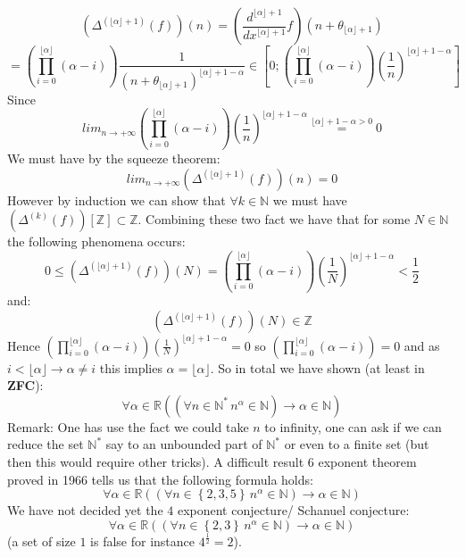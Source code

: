 \begin{solution}
    \[
        \left(\Delta^{\left(\lfloor\alpha\rfloor+1\right)}\left(f\right)\right)\left(n\right)=\left(\frac{d^{\lfloor\alpha\rfloor+1}}{dx^{\lfloor\alpha\rfloor+1}}f\right)\left(n+\theta_{\lfloor\alpha\rfloor+1}\right)
    \]
    \[
        =\left(\prod_{i=0}^{\lfloor\alpha\rfloor}\left(\alpha-i\right)\right)\frac{1}{\left(n+\theta_{\lfloor\alpha\rfloor+1}\right)^{\lfloor\alpha\rfloor+1-\alpha}}\in\left[0;\left(\prod_{i=0}^{\lfloor\alpha\rfloor}\left(\alpha-i\right)\right)\left(\frac{1}{n}\right)^{\lfloor\alpha\rfloor+1-\alpha}\right]
    \]
    Since
    \[
        lim_{n\rightarrow+\infty}\left(\prod_{i=0}^{\lfloor\alpha\rfloor}\left(\alpha-i\right)\right)\left(\frac{1}{n}\right)^{\lfloor\alpha\rfloor+1-\alpha}\overset{\lfloor\alpha\rfloor+1-\alpha>0}{=}0
    \]
    We must have by the squeeze theorem:
    \[
        lim_{n\rightarrow+\infty}\left(\Delta^{\left(\lfloor\alpha\rfloor+1\right)}\left(f\right)\right)\left(n\right)=0
    \]
    However by induction we can show that \( \forall k\in\mathbb{N} \) we must have \( \left(\Delta^{\left(k\right)}\left(f\right)\right)\left[\mathbb{Z}\right]\subset\mathbb{Z} \). Combining these two fact we have that for some \( N\in\mathbb{N} \) the following phenomena occurs:
    \[
        0\leq \left(\Delta^{\left(\lfloor\alpha\rfloor+1\right)}\left(f\right)\right)\left(N\right)=\left(\prod_{i=0}^{\lfloor\alpha\rfloor}\left(\alpha-i\right)\right)\left(\frac{1}{N}\right)^{\lfloor\alpha\rfloor+1-\alpha}<\frac{1}{2}
    \]
    and:
    \[
        \left(\Delta^{\left(\lfloor\alpha\rfloor+1\right)}\left(f\right)\right)\left(N\right)\in\mathbb{Z}
    \]
    Hence \( \left(\prod_{i=0}^{\lfloor\alpha\rfloor}\left(\alpha-i\right)\right)\left(\frac{1}{N}\right)^{\lfloor\alpha\rfloor+1-\alpha}=0 \) so \( \left(\prod_{i=0}^{\lfloor\alpha\rfloor}\left(\alpha-i\right)\right)=0 \) and as \( i<\lfloor\alpha\rfloor\rightarrow \alpha\neq i \) this implies \( \alpha=\lfloor\alpha\rfloor \). So in total we have shown (at least in \textbf{ZFC}):
    \[
        \forall\alpha\in\mathbb{R}\left(\left(\forall n\in\mathbb{N}^{*}\, n^{\alpha}\in\mathbb{N}\right)\rightarrow \alpha\in\mathbb{N}\right)
    \]
    Remark: One has use the fact we could take \( n \) to infinity, one can ask if we can reduce the set \( \mathbb{N}^{*} \) say to an unbounded part of \( \mathbb{N}^{*} \) or even to a finite set (but then this would require other tricks). A difficult result \( 6 \) exponent theorem proved in 1966 tells us that the following formula holds:
    \[
        \forall\alpha\in\mathbb{R}\left(\left(\forall n\in\left\{2,3,5\right\}\, n^{\alpha}\in\mathbb{N}\right)\rightarrow \alpha\in\mathbb{N}\right)
    \]
    We have not decided yet the \( 4 \) exponent conjecture/ Schanuel conjecture:
    \[
        \forall\alpha\in\mathbb{R}\left(\left(\forall n\in\left\{2,3\right\}\, n^{\alpha}\in\mathbb{N}\right)\rightarrow \alpha\in\mathbb{N}\right)
    \]
    (a set of size \( 1 \) is false for instance \( 4^{\frac{1}{2}}=2 \)). \\
\end{solution}
